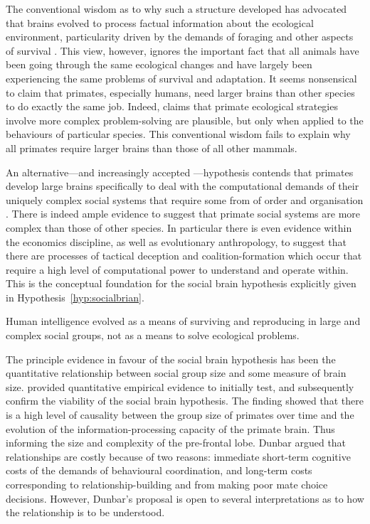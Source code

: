 The conventional wisdom as to why such a structure developed has advocated that brains evolved to process factual information about the ecological environment, particularity driven by the demands of foraging and other aspects of survival \citep{BrockHarvey1980}. This view, however, ignores the important fact that all animals have been going through the same ecological changes and have largely been experiencing the same problems of survival and adaptation. It seems nonsensical to claim that primates, especially humans, need larger brains than other species to do exactly the same job. Indeed, claims that primate ecological strategies involve more complex problem-solving are plausible, but only when applied to the behaviours of particular species. This conventional wisdom fails to explain why all primates require larger brains than those of all other mammals.

An alternative---and increasingly accepted \citep{Dunbar2009}---hypothesis contends that primates develop large brains specifically to deal with the computational demands of their uniquely complex social systems that require some from of order and organisation \citep{WhitenByrne1988}. There is indeed ample evidence to suggest that primate social systems are more complex than those of other species. In particular there is even evidence within the economics discipline, as well as evolutionary anthropology, to suggest that there are processes of tactical deception and coalition-formation which occur that require a high level of computational power to understand and operate within. This is the conceptual foundation for the social brain hypothesis explicitly given in Hypothesis~\ref{hyp:socialbrian}.

\begin{hypothesis} \label{hyp:socialbrian}
Human intelligence evolved as a means of surviving and reproducing in large and complex social groups, not as a means to solve ecological problems.
\end{hypothesis}

The principle evidence in favour of the social brain hypothesis has been the quantitative relationship between social group size and some measure of brain size. \citet{Dunbar1998} provided quantitative empirical evidence to initially test, and subsequently confirm the viability of the social brain hypothesis. The finding showed that there is a high level of causality between the group size of primates over time and the evolution of the information-processing capacity of the primate brain. Thus informing the size and complexity of the pre-frontal lobe. Dunbar argued that relationships are costly because of two reasons: immediate short-term cognitive costs of the demands of behavioural coordination, and long-term costs corresponding to relationship-building and from making poor mate choice decisions. However, Dunbar's proposal is open to several interpretations as to how the relationship is to be understood.

